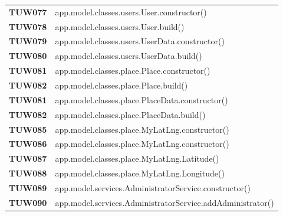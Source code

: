 \documentclass[../../piano-di-qualifica.tex]{subfiles}
\begin{document}
\begin{longtable}[H]{>{\centering\bfseries}m{3cm} >{}m{13cm}}

TUW077             & app.model.classes.users.User.constructor\@()\\ 

TUW078             & app.model.classes.users.User.build\@()\\ 
 

TUW079             & app.model.classes.users.UserData.constructor\@()\\ 

TUW080             & app.model.classes.users.UserData.build\@()\\ 
 

TUW081             & app.model.classes.place.Place.constructor\@()\\ 

TUW082             & app.model.classes.place.Place.build\@()\\ 
 

TUW081             & app.model.classes.place.PlaceData.constructor\@()\\ 

TUW082             & app.model.classes.place.PlaceData.build\@()\\ 
 

TUW085              & app.model.classes.place.MyLatLng.constructor\@()\\ 

TUW086             & app.model.classes.place.MyLatLng.constructor\@()\\ 
 
TUW087             & app.model.classes.place.MyLatLng.Latitude\@()\\  

TUW088             & app.model.classes.place.MyLatLng.Longitude\@()\\ 


TUW089             & app.model.services.AdministratorService.constructor\@()\\ 

TUW090             & app.model.services.AdministratorService.addAdministrator\@()\\ 


\end{longtable}
\end{document}
